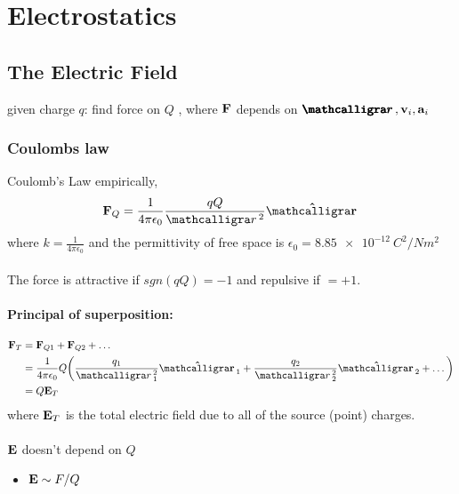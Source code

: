 \documentclass[../main.tex]{subfiles}
\begin{document}
\pagestyle{fancy}

\section{Electrostatics}
\barh \vspace{1em}

\subsection{The Electric Field}

given charge $q$: find force on $Q$ , where $\vb F$ depends on $\boldscriptr, \vb v_i, \vb a_i$

\subsubsection{Coulombs law}

Coulomb's Law empirically,
\[\vb F_Q = \ke \frac{qQ}{\scriptr^2} \vu\scriptr\]
where $k = \frac{1}{4\pi\epsilon_0}$ and the permittivity of free space is $\epsilon_0 = \qty{8.85e-12}{C^2/Nm^2}$

\paragraph*{} The force is attractive if $sgn(qQ) = -1$ and repulsive if $= +1$.

\paragraph*{Principal of superposition:}
\begin{align*}
    \vb F_T &= \vb F_{Q1} + \vb F_{Q2} + \dots \\
    &= \ke Q \qt(\frac{q_1}{\scriptr_1^2} \vu\scriptr_1 + \frac{q_2}{\scriptr_2^2} \vu\scriptr_2 + \dots) \\
    &= Q \vb E_T
\end{align*}
where $\vb E_T$ is the total electric field due to all of the source (point) charges.

\paragraph*{}$\vb E$ doesn't depend on $Q$
\begin{itemize}
    \item $\vb E \sim F/Q$
\end{itemize}
\end{document}
